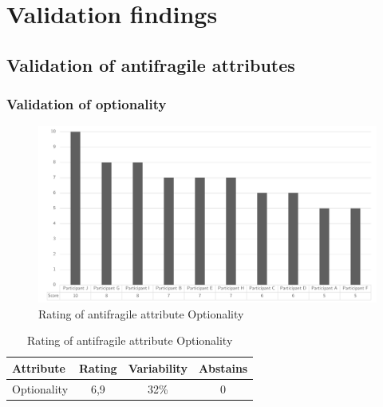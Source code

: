 \chapter{Validation findings}

\section{Validation of antifragile attributes}
\label{sec:validationofafattributes}
\subsection{Validation of optionality}
\label{sub:validationofoptionality}
\begin{figure}[H]
	\centering
	\includegraphics[width=0.9\linewidth]{images/scoreafoptionality}
	\caption[Rating of antifragile attribute Optionality]{Rating of antifragile attribute Optionality}
	\label{fig:appscoringafoptionality}
\end{figure}
\begin{table}[H]
	\centering
	\begin{tabular}{p{}ccc}
		\toprule
		\textbf{Attribute} & \textbf{Rating} & \textbf{Variability} & \textbf{Abstains} \\
		\midrule
		Optionality & 6,9 & 32\% & 0 \\%
		\bottomrule
	\end{tabular}%
	\caption[Rating of antifragile attribute Optionality]{Rating of antifragile attribute Optionality}
	\label{tab:appscoringafoptionality}%
\end{table}%
\newpage
